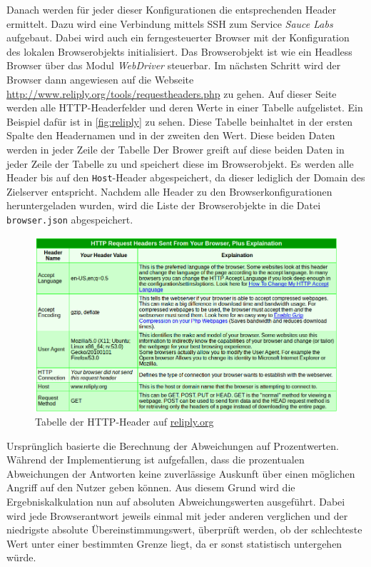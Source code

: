 Danach werden für jeder dieser Konfigurationen die entsprechenden Header ermittelt.
Dazu wird eine Verbindung mittels \ac{SSH} zum Service \textit{Sauce Labs} aufgebaut.
Dabei wird auch ein ferngesteuerter Browser mit der Konfiguration des lokalen Browserobjekts initialisiert.
Das Browserobjekt ist wie ein Headless Browser über das Modul \textit{WebDriver} steuerbar.
Im nächsten Schritt wird der Browser dann angewiesen auf die Webseite \url{http://www.reliply.org/tools/requestheaders.php} zu gehen.
Auf dieser Seite werden alle \ac{HTTP}-Headerfelder und deren Werte in einer Tabelle aufgelistet.
Ein Beispiel dafür ist in \autoref{fig:reliply} zu sehen.
Diese Tabelle beinhaltet in der ersten Spalte den Headernamen und in der zweiten den Wert.
Diese beiden Daten werden in jeder Zeile der Tabelle 
Der Brower greift auf diese beiden Daten in jeder Zeile der Tabelle zu und speichert diese im Browserobjekt.
Es werden alle Header bis auf den \lstinline{Host}-Header abgespeichert, da dieser lediglich der Domain des Zielserver entspricht.
Nachdem alle Header zu den Browserkonfigurationen heruntergeladen wurden, wird die Liste der Browserobjekte in die Datei \lstinline{browser.json} abgespeichert.

\begin{figure}[H]
	\centering
	\includegraphics[width=\textwidth]{images/reliply.png}
	\caption{Tabelle der \ac{HTTP}-Header auf \url{reliply.org}}
	\label{fig:reliply}
\end{figure}

Ursprünglich basierte die Berechnung der Abweichungen auf Prozentwerten.
Während der Implementierung ist aufgefallen, dass die prozentualen Abweichungen der Antworten keine zuverlässige Auskunft über einen möglichen Angriff auf den Nutzer geben können.
Aus diesem Grund wird die Ergebniskalkulation nun auf absoluten Abweichungswerten ausgeführt.
Dabei wird jede Browserantwort jeweils einmal mit jeder anderen verglichen und der niedrigste absolute Übereinstimmungswert, 
überprüft werden, ob der schlechteste Wert unter einer bestimmten Grenze liegt, da er sonst statistisch untergehen würde.


